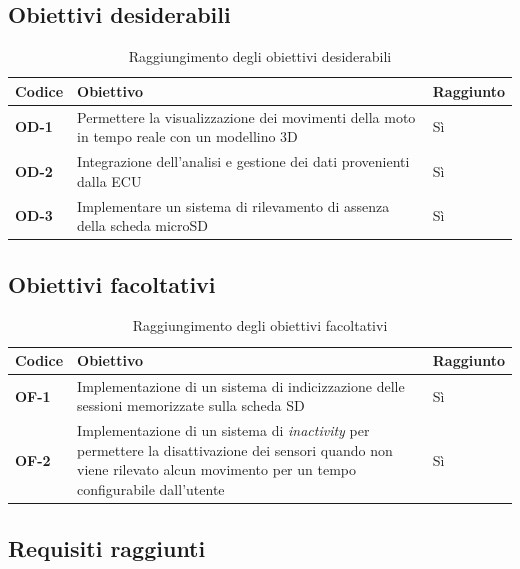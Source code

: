 \subsection{Obiettivi desiderabili}

\begin{table}[H]
    \centering
    \begin{tabular}{|p{1.6cm}|p{11cm}|p{2.2cm}|}
        \hline
        \textbf{Codice} & \textbf{Obiettivo} & \textbf{Raggiunto} \\
        \hline
        \textbf{OD-1} & Permettere la visualizzazione dei movimenti della moto in tempo reale con un modellino 3D & Sì \\
        \hline
        \textbf{OD-2} & Integrazione dell'analisi e gestione dei dati provenienti dalla ECU & Sì \\
        \hline
        \textbf{OD-3} & Implementare un sistema di rilevamento di assenza della scheda microSD & Sì \\
        \hline
    \end{tabular}
    \caption{Raggiungimento degli obiettivi desiderabili}
    \label{tab:obiettivi-desiderabili}
\end{table}

\subsection{Obiettivi facoltativi}

\begin{table}[H]
    \centering
    \begin{tabular}{|p{1.6cm}|p{11cm}|p{2.2cm}|}
        \hline
        \textbf{Codice} & \textbf{Obiettivo} & \textbf{Raggiunto} \\
        \hline
        \textbf{OF-1} & Implementazione di un sistema di indicizzazione delle sessioni memorizzate sulla scheda SD & Sì \\
        \hline
        \textbf{OF-2} & Implementazione di un sistema di \textit{inactivity} per permettere la disattivazione dei sensori quando non viene rilevato alcun movimento per un tempo configurabile dall'utente & Sì \\
        \hline
    \end{tabular}
    \caption{Raggiungimento degli obiettivi facoltativi}
    \label{tab:obiettivi-facoltativi}
\end{table}

\subsection{Requisiti raggiunti}

